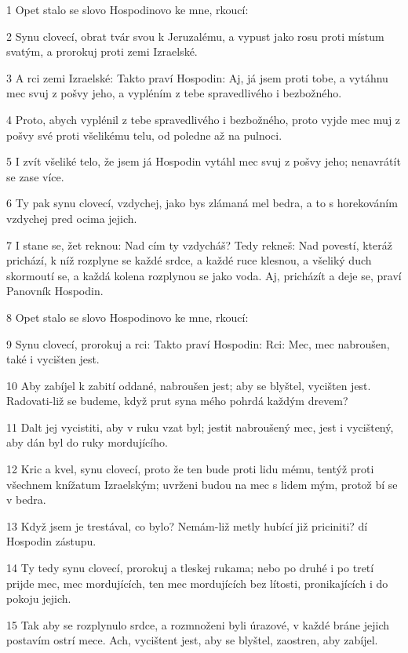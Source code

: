 \par 1 Opet stalo se slovo Hospodinovo ke mne, rkoucí:
\par 2 Synu clovecí, obrat tvár svou k Jeruzalému, a vypust jako rosu proti místum svatým, a prorokuj proti zemi Izraelské.
\par 3 A rci zemi Izraelské: Takto praví Hospodin: Aj, já jsem proti tobe, a vytáhnu mec svuj z pošvy jeho, a vypléním z tebe spravedlivého i bezbožného.
\par 4 Proto, abych vyplénil z tebe spravedlivého i bezbožného, proto vyjde mec muj z pošvy své proti všelikému telu, od poledne až na pulnoci.
\par 5 I zvít všeliké telo, že jsem já Hospodin vytáhl mec svuj z pošvy jeho; nenavrátít se zase více.
\par 6 Ty pak synu clovecí, vzdychej, jako bys zlámaná mel bedra, a to s horekováním vzdychej pred ocima jejich.
\par 7 I stane se, žet reknou: Nad cím ty vzdycháš? Tedy rekneš: Nad povestí, kteráž prichází, k níž rozplyne se každé srdce, a každé ruce klesnou, a všeliký duch skormoutí se, a každá kolena rozplynou se jako voda. Aj, pricházít a deje se, praví Panovník Hospodin.
\par 8 Opet stalo se slovo Hospodinovo ke mne, rkoucí:
\par 9 Synu clovecí, prorokuj a rci: Takto praví Hospodin: Rci: Mec, mec nabroušen, také i vycišten jest.
\par 10 Aby zabíjel k zabití oddané, nabroušen jest; aby se blyštel, vycišten jest. Radovati-liž se budeme, když prut syna mého pohrdá každým drevem?
\par 11 Dalt jej vycistiti, aby v ruku vzat byl; jestit nabroušený mec, jest i vycištený, aby dán byl do ruky mordujícího.
\par 12 Kric a kvel, synu clovecí, proto že ten bude proti lidu mému, tentýž proti všechnem knížatum Izraelským; uvrženi budou na mec s lidem mým, protož bí se v bedra.
\par 13 Když jsem je trestával, co bylo? Nemám-liž metly hubící již priciniti? dí Hospodin zástupu.
\par 14 Ty tedy synu clovecí, prorokuj a tleskej rukama; nebo po druhé i po tretí prijde mec, mec mordujících, ten mec mordujících bez lítosti, pronikajících i do pokoju jejich.
\par 15 Tak aby se rozplynulo srdce, a rozmnoženi byli úrazové, v každé bráne jejich postavím ostrí mece. Ach, vycištent jest, aby se blyštel, zaostren, aby zabíjel.

